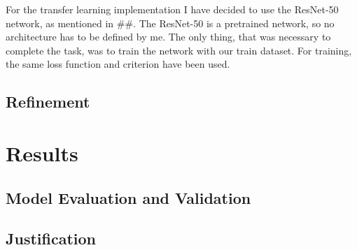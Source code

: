 \documentclass{article}
\begin{document}
For the transfer learning implementation I have decided to use the ResNet-50 network, as mentioned in ##. The ResNet-50 is a pretrained network, so no architecture has to be defined by me. The only thing, that was necessary to complete the task, was to train the network with our train dataset. For training, the same loss function and criterion have been used.

\subsection{Refinement}

\section{Results} \label{s_results}

\subsection{Model Evaluation and Validation}

\subsection{Justification}



\end{document}
